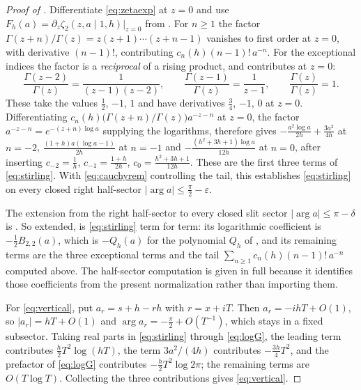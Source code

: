 \documentclass[11pt,letterpaper]{article}
\newcommand{\Fh}{F_h}
\newcommand{\Zt}{\zeta_2}
\begin{document}
\begin{proof}[Proof of ]
Differentiate \eqref{eq:zetaexp} at $z=0$ and use
$\Fh(a)=\partial_z\Zt(z,a\mid1,h)\big|_{z=0}$ from .
For $n\ge1$ the factor $\Gamma(z+n)/\Gamma(z)=z(z+1)\cdots(z+n-1)$ vanishes to
first order at $z=0$, with derivative $(n-1)!$, contributing
$c_n(h)(n-1)!\,a^{-n}$. For the exceptional indices the factor is a
\emph{reciprocal} of a rising product, and contributes at $z=0$:
\begin{equation}
  \frac{\Gamma(z-2)}{\Gamma(z)}=\frac{1}{(z-1)(z-2)},
  \qquad
  \frac{\Gamma(z-1)}{\Gamma(z)}=\frac{1}{z-1},
  \qquad
  \frac{\Gamma(z)}{\Gamma(z)}=1 .
  \label{eq:gammaratios}
\end{equation}
These take the values $\tfrac12$, $-1$, $1$ and have derivatives
$\tfrac34$, $-1$, $0$ at $z=0$.
Differentiating $c_n(h)\bigl(\Gamma(z+n)/\Gamma(z)\bigr)a^{-z-n}$ at $z=0$, the
factor $a^{-z-n}=e^{-(z+n)\log a}$ supplying the logarithms, therefore gives
$-\tfrac{a^{2}\log a}{2h}+\tfrac{3a^{2}}{4h}$ at $n=-2$,
$\tfrac{(1+h)a(\log a-1)}{2h}$ at $n=-1$ and
$-\tfrac{(h^{2}+3h+1)\log a}{12h}$ at $n=0$, after inserting
$c_{-2}=\tfrac1h$, $c_{-1}=\tfrac{1+h}{2h}$, $c_{0}=\tfrac{h^{2}+3h+1}{12h}$.
These are the first three terms of \eqref{eq:stirling}. With
\eqref{eq:cauchyrem} controlling the tail, this establishes
\eqref{eq:stirling} on every closed right half-sector
$\lvert\arg a\rvert\le\tfrac{\pi}{2}-\varepsilon$.

The extension from the right half-sector to every closed slit sector
$\lvert\arg a\rvert\le\pi-\delta$ is . So extended,
\cite[(3.13)]{Ruij} is \eqref{eq:stirling} term for term: its logarithmic
coefficient is $-\tfrac12B_{2,2}(a)$, which is $-Q_h(a)$ for the polynomial
$Q_h$ of , and its remaining terms are the three exceptional
terms and the tail $\sum_{n\ge1}c_n(h)(n-1)!\,a^{-n}$ computed above. The
half-sector computation is given in full because it identifies those coefficients
from the present normalization rather than importing them.

For \eqref{eq:vertical}, put $a_r=s+h-rh$ with $r=x+iT$. Then
$a_r=-ihT+O(1)$, so $\lvert a_r\rvert=hT+O(1)$ and
$\arg a_r=-\tfrac{\pi}{2}+O(T^{-1})$, which stays in a fixed subsector.
Taking real parts in \eqref{eq:stirling} through \eqref{eq:logG}, the leading
term contributes $\tfrac h2T^{2}\log(hT)$, the term $3a^{2}/(4h)$ contributes
$-\tfrac{3h}{4}T^{2}$, and the prefactor of \eqref{eq:logG} contributes
$-\tfrac h2T^{2}\log 2\pi$; the remaining terms are $O(T\log T)$. Collecting the
three contributions gives \eqref{eq:vertical}.
\end{proof}
\end{document}
